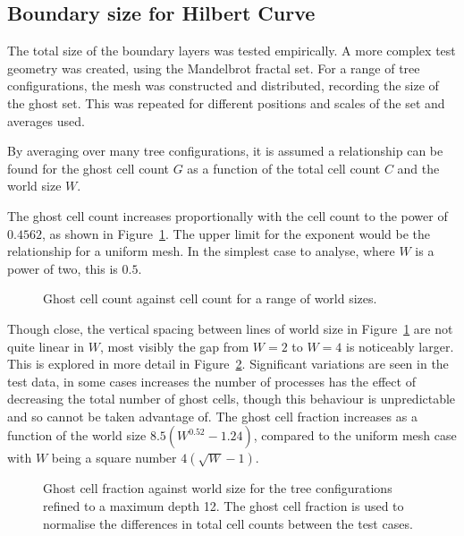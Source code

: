 \documentclass[twoside]{IIBproject}
\numberwithin{figure}{section}
\begin{document}
    \subsection{Boundary size for Hilbert Curve}
        \label{sec:results-boundarysize}

        The total size of the boundary layers was tested empirically. A more complex test geometry was created, using the Mandelbrot fractal set. For a range of tree configurations, the mesh was constructed and distributed, recording the size of the ghost set. This was repeated for different positions and scales of the set and averages used.

        By averaging over many tree configurations, it is assumed a relationship can be found for the ghost cell count $G$ as a function of the total cell count $C$ and the world size $W$.

        The ghost cell count increases proportionally with the cell count to the power of $0.4562$, as shown in Figure~\ref{fig:anal-scaling}. The upper limit for the exponent would be the relationship for a uniform mesh. In the simplest case to analyse, where $W$ is a power of two, this is $0.5$. 

        \tikzset{external/export next=false}
        \begin{figure}[!htbp]
            \centering
            
            \caption{Ghost cell count against cell count for a range of world sizes. }
            \label{fig:anal-scaling}
        \end{figure}

        Though close, the vertical spacing between lines of world size in Figure~\ref{fig:anal-scaling} are not quite linear in $W$, most visibly the gap from $W=2$ to $W=4$ is noticeably larger. This is explored in more detail in Figure~\ref{fig:anal-borderworldsize}. Significant variations are seen in the test data, in some cases increases the number of processes has the effect of decreasing the total number of ghost cells, though this behaviour is unpredictable and so cannot be taken advantage of. The ghost cell fraction increases as a function of the world size $8.5(W^{0.52}-1.24)$, compared to the uniform mesh case with $W$ being a square number $4(\sqrt{W} - 1)$. 

        \tikzset{external/export next=false}
        \begin{figure}[!htbp]
            \centering
            
            \caption{Ghost cell fraction against world size for the tree configurations refined to a maximum depth 12. The ghost cell fraction is used to normalise the differences in total cell counts between the test cases.}
            \label{fig:anal-borderworldsize}
        \end{figure}
\end{document}
